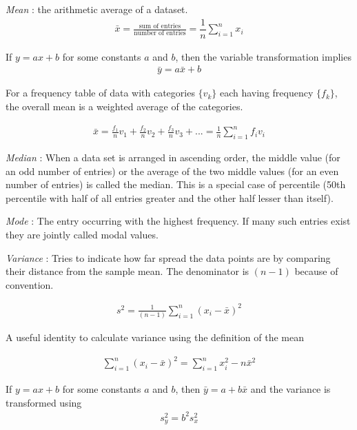 \textit{Mean} : the arithmetic average of a dataset.
\begin{align}
	\bar{x} = \frac{\text{sum of entries}}{\text{number of entries}} = \dfrac{1}{n} \sum\limits_{i = 1}^{n} x_{i} 
\end{align}

If $ y = ax + b $ for some constants $ a $ and $ b $, then the variable transformation implies 
\begin{align}
	\bar{y} = a \bar{x} + b
\end{align}

For a frequency table of data with categories $ \{v_k\} $ each having frequency $ \{f_k\} $, the overall mean is a weighted average of the categories. 

\begin{align}
	\bar{x} = \frac{f_{1}}{n} v_{1} + \frac{f_{2}}{n} v_{2} + \frac{f_{3}}{n} v_{3} + ... = \frac{1}{n} \sum\limits_{i = 1}^{n} f_{i}v_{i}
\end{align}

\textit{Median} : When a data set is arranged in ascending order, the middle value (for an odd number of entries) or the average of the two middle values (for an even number of entries) is called the median. This is a special case of percentile (50th percentile with half of all entries greater and the other half lesser than itself).

\textit{Mode} : The entry occurring with the highest frequency. If many such entries exist they are jointly called modal values.

\textit{Variance} : Tries to indicate how far spread the data points are by comparing their distance from the sample mean. The denominator is $ (n - 1) $ because of convention.

\begin{align}
	s^2 = \frac{1}{(n-1)}\sum\limits_{i = 1}^{n}(x_{i} - \bar{x})^2
\end{align}

A useful identity to calculate variance using the definition of the mean

\begin{align}
	\sum\limits_{i = 1}^{n}(x_{i} - \bar{x})^2 = \sum\limits_{i = 1}^{n} x_{i}^2 - n \bar{x}^2
\end{align}

If $ y = ax + b $ for some constants $ a $ and $ b $, then $ \bar{y} = a + b \bar{x} $ and the variance is transformed using
\begin{align}
	s_{y}^{2} = b^{2} s_{x}^{2}
\end{align}

